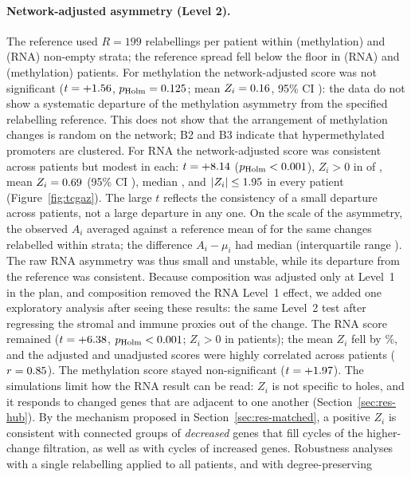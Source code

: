 \begin{table}[t]
\centering\small
\caption{TCGA-BRCA, \tcgaN{} tumour--normal pairs: studentized mean $t$ over patients and sign-flip $p$-value with Holm over the two layers ($B=9{,}999$, so the smallest attainable $p$ is $10^{-4}$). Upper block: topological statistics; the composition-adjusted $Z_i$ is an exploratory analysis decided after the frozen results were seen. Lower block: baselines on the same patients and sign flips.}
\label{tab:tcga}

\end{table}

\paragraph{Network-adjusted asymmetry (Level 2).} The reference used $R=199$ relabellings per patient within \methStrata{} (methylation) and \rnaStrata{} (RNA) non-empty strata; the reference spread fell below the floor in \atFloorRna{} (RNA) and \atFloorMeth{} (methylation) patients. For methylation the network-adjusted score was not significant ($t=+1.56$, $p_{\mathrm{Holm}}=0.125$; mean $Z_i=0.16$, 95\% CI \ZciMeth): the data do not show a systematic departure of the methylation asymmetry from the specified relabelling reference. This does not show that the arrangement of methylation changes is random on the network; B2 and B3 indicate that hypermethylated promoters are clustered. For RNA the network-adjusted score was consistent across patients but modest in each: $t=+8.14$ ($p_{\mathrm{Holm}}<0.001$), $Z_i>0$ in \ZposRna{} of \tcgaN, mean $Z_i=0.69$ (95\% CI \ZciRna), median \ZmedRna, and $|Z_i|\le1.95$ in every patient (Figure~\ref{fig:tcgaz}). The large $t$ reflects the consistency of a small departure across patients, not a large departure in any one. On the scale of the asymmetry, the observed $A_i$ averaged \AmeanRna{} against a reference mean of \AmuRna{} for the same changes relabelled within strata; the difference $A_i-\mu_i$ had median \AmuMedRna{} (interquartile range \AmuIQRRna). The raw RNA asymmetry was thus small and unstable, while its departure from the reference was consistent. Because composition was adjusted only at Level~1 in the plan, and composition removed the RNA Level~1 effect, we added one exploratory analysis after seeing these results: the same Level~2 test after regressing the stromal and immune proxies out of the change. The RNA score remained ($t=+6.38$, $p_{\mathrm{Holm}}<0.001$; $Z_i>0$ in \ZcompposRna{} patients); the mean $Z_i$ fell by \ZcompdropRna\%, and the adjusted and unadjusted scores were highly correlated across patients ($r=0.85$). The methylation score stayed non-significant ($t=+1.97$). The simulations limit how the RNA result can be read: $Z_i$ is not specific to holes, and it responds to changed genes that are adjacent to one another (Section~\ref{sec:res-hub}). By the mechanism proposed in Section~\ref{sec:res-matched}, a positive $Z_i$ is consistent with connected groups of \emph{decreased} genes that fill cycles of the higher-change filtration, as well as with cycles of increased genes. Robustness analyses with a single relabelling applied to all patients, and with degree-preserving 